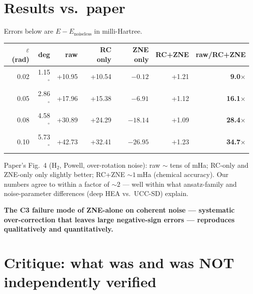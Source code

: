 \documentclass[11pt]{article}
\begin{document}
\section{Results vs.\ paper}
Errors below are $E-E_{\text{noiseless}}$ in milli-Hartree.
\begin{center}
\begin{tabular}{rrrrrrr}
\toprule
$\varepsilon$ (rad) & deg & raw & RC only & ZNE only & RC+ZNE & raw/RC+ZNE \\
\midrule
0.02 & 1.15$^\circ$ & +10.95 & +10.54 & $-0.12$ & +1.21 & \textbf{9.0$\times$} \\
0.05 & 2.86$^\circ$ & +17.96 & +15.38 & $-6.91$ & +1.12 & \textbf{16.1$\times$} \\
0.08 & 4.58$^\circ$ & +30.89 & +24.29 & $-18.14$ & +1.09 & \textbf{28.4$\times$} \\
0.10 & 5.73$^\circ$ & +42.73 & +32.41 & $-26.95$ & +1.23 & \textbf{34.7$\times$} \\
\bottomrule
\end{tabular}
\end{center}

Paper's Fig.~4 (H$_2$, Powell, over-rotation noise): raw $\sim$ tens of mHa;
RC-only and ZNE-only only slightly better; RC+ZNE $\sim 1$\,mHa (chemical
accuracy). Our numbers agree to within a factor of $\sim 2$ --- well within
what ansatz-family and noise-parameter differences (deep HEA vs.\ UCC-SD)
explain.

\textbf{The C3 failure mode of ZNE-alone on coherent noise --- systematic
over-correction that leaves large negative-sign errors --- reproduces
qualitatively and quantitatively.}

\section{Critique: what was and was NOT independently verified}
\end{document}
